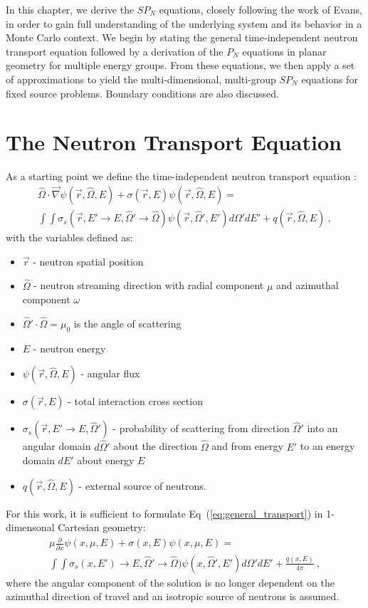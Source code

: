 In this chapter, we derive the $SP_N$ equations, closely following the
work of Evans, in order to gain full understanding of the underlying
system and its behavior in a Monte Carlo context. We begin by stating
the general time-independent neutron transport equation followed by a
derivation of the $P_N$ equations in planar geometry for multiple
energy groups. From these equations, we then apply a set of
approximations to yield the multi-dimensional, multi-group $SP_N$
equations for fixed source problems. Boundary conditions are also
discussed.

\section{The Neutron Transport Equation}
\label{sec:transport_eq}
As a starting point we define the time-independent neutron transport
equation \citep{lewis_computational_1993}:
\begin{multline}
  \hat{\Omega} \cdot \vec{\nabla} \psi(\vec{r},\hat{\Omega},E) +
  \sigma(\vec{r},E) \psi(\vec{r},\hat{\Omega},E) = \\ \int \int
  \sigma_s(\vec{r},E' \rightarrow E,\hat{\Omega}' \rightarrow
  \hat{\Omega}) \psi(\vec{r},\hat{\Omega}',E') d\Omega' dE' +
  q(\vec{r},\hat{\Omega},E)\:,
  \label{eq:general_transport}
\end{multline}
with the variables defined as:
\begin{itemize}
\item $\vec{r}$ - neutron spatial position
\item $\hat{\Omega}$ - neutron streaming direction with radial
  component $\mu$ and azimuthal component $\omega$
\item $\hat{\Omega}' \cdot \hat{\Omega} = \mu_0$ is the angle of
  scattering
\item $E$ - neutron energy
\item $\psi(\vec{r},\hat{\Omega},E)$ - angular flux
\item $\sigma(\vec{r},E)$ - total interaction cross section
\item $\sigma_s(\vec{r},E' \rightarrow E,\hat{\Omega}')$ - probability
  of scattering from direction $\hat{\Omega}'$ into an angular domain
  $d\hat{\Omega}'$ about the direction $\hat{\Omega}$ and from energy
  $E'$ to an energy domain $dE'$ about energy $E$
\item $q(\vec{r},\hat{\Omega},E)$ - external source of neutrons.
\end{itemize}
For this work, it is sufficient to formulate
Eq~(\ref{eq:general_transport}) in 1-dimensonal Cartesian geometry:
\begin{multline}
  \mu \frac{\partial}{\partial x} \psi(x,\mu,E) + \sigma(x,E)
  \psi(x,\mu,E) = \\ \int \int \sigma_s(x,E') \rightarrow
  E,\hat{\Omega}' \rightarrow \hat{\Omega}) \psi(x,\hat{\Omega}',E')
  d\Omega' dE' + \frac{q(x,E)}{4 \pi}\:,
  \label{eq:cart_1d_transport}
\end{multline}
where the angular component of the solution is no longer dependent on
the azimuthal direction of travel and an isotropic source of neutrons
is assumed.

